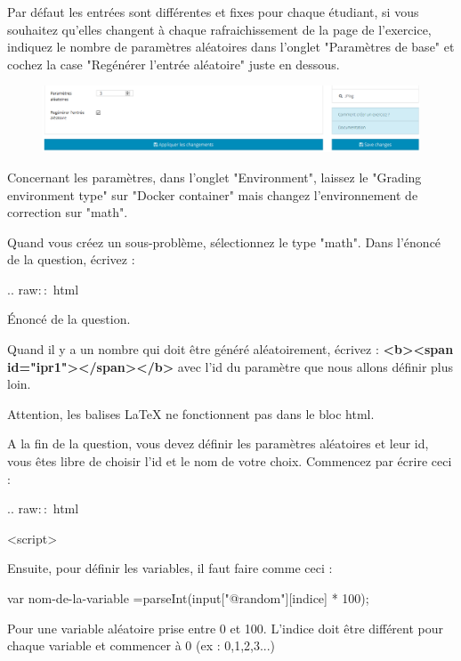 \documentclass{article}
\begin{document}
Par défaut les entrées sont différentes et fixes pour chaque étudiant, si vous souhaitez qu'elles changent à chaque rafraichissement de la page de l'exercice, indiquez le nombre de paramètres aléatoires dans l'onglet "Paramètres de base" et cochez la case "Regénérer l'entrée aléatoire" juste en dessous.
\bigskip

\begin{figure}[!htb]
    \centering
    \includegraphics[scale=0.45]{images/Para_random.png}
\end{figure}


Concernant les paramètres, dans l'onglet "Environment", laissez le "Grading environment type" sur "Docker container" mais changez l'environnement de correction sur "math". 

Quand vous créez un sous-problème, sélectionnez le type "math". Dans l'énoncé de la question, écrivez :
\bigskip

.. raw${::}$ html

\bigskip
\hspace{1cm} Énoncé de la question. 

\bigskip
Quand il y a un nombre qui doit être généré aléatoirement, écrivez : \textbf{<b><span id="ipr1"></span></b>} avec l'id du paramètre que nous allons définir plus loin. 

Attention, les balises LaTeX ne fonctionnent pas dans le bloc html.

\bigskip

A la fin de la question, vous devez définir les paramètres aléatoires et leur id, vous êtes libre de choisir l'id et le nom de votre choix. Commencez par écrire ceci :
\bigskip

.. raw${::}$ html

\bigskip
\hspace{1cm} <script>

\bigskip
Ensuite, pour définir les variables, il faut faire comme ceci :
\bigskip

\hspace{2cm}var nom-de-la-variable =parseInt(input["@random"][indice] * 100);

\bigskip

Pour une variable aléatoire prise entre 0 et 100. L'indice doit être différent pour chaque variable et commencer à 0 (ex : 0,1,2,3...)
\end{document}

